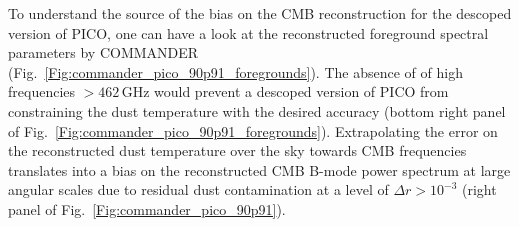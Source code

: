 \documentclass[12pt]{article}
\begin{document}
To understand the source of the bias on the CMB reconstruction for the descoped version of PICO, one can have a look at the reconstructed foreground spectral parameters by COMMANDER (Fig.~\ref{Fig:commander_pico_90p91_foregrounds}). The absence of of high frequencies $> 462$\,GHz would prevent a descoped version of PICO from constraining the dust temperature with the desired accuracy (bottom right panel of Fig.~\ref{Fig:commander_pico_90p91_foregrounds}). Extrapolating the error on the reconstructed dust temperature over the sky towards CMB frequencies translates into a bias on the reconstructed CMB B-mode power spectrum at large angular scales due to residual dust contamination at a level of $\Delta r > 10^{-3}$ (right panel of Fig.~\ref{Fig:commander_pico_90p91}).

\end{document}

